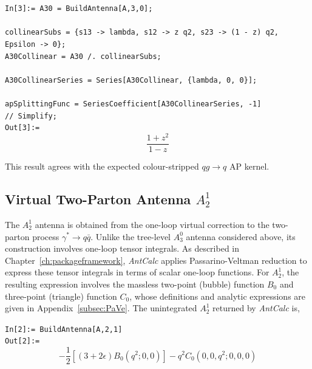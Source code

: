 \begin{mdframed}[backgroundcolor=gray!10, linewidth=0pt]
    \texttt{In[3]:= A30 = BuildAntenna[A,3,0];\\
                    \\
                    collinearSubs = \{s13 -> lambda, s12 -> z q2, s23 -> (1 - z) q2, \\Epsilon
                     -> 0\};\\
                    A30Collinear = A30 /. collinearSubs;\\
                    \\
                    A30CollinearSeries = Series[A30Collinear, \{lambda, 0, 0\}];\\
                    \\
                    apSplittingFunc = SeriesCoefficient[A30CollinearSeries, -1]\\ 
                    // Simplify;}\\
    \hfill
    \texttt{Out[3]:=}
        \begin{equation*}
            \frac{1+z^2}{1-z}
        \end{equation*}
\end{mdframed}

This result agrees with the expected colour-stripped $qg\to q$ AP kernel. 

\subsection{Virtual Two-Parton Antenna $A_2^1$}\label{subsec:A21}

The $A_2^1$ antenna is obtained from the one-loop virtual correction to the two-parton process
$\gamma^*\to q\bar q$.
Unlike the tree-level $A_3^0$ antenna considered above, its construction involves one-loop tensor
integrals. As described in Chapter~\ref{ch:packageframework}, \textit{AntCalc} applies
Passarino-Veltman reduction to express these tensor integrals in terms of scalar one-loop functions.
For $A_2^1$, the resulting expression involves the massless two-point (bubble) function $B_0$ and
three-point (triangle) function $C_0$, whose definitions and analytic expressions are given in
Appendix~\ref{subsec:PaVe}. The unintegrated $A_2^1$ returned by \textit{AntCalc} is,

\begin{mdframed}[backgroundcolor=gray!10, linewidth=0pt]
\texttt{In[2]:= BuildAntenna[A,2,1]}\\
\hfill
\texttt{Out[2]:=}
    \begin{equation*}
        -\frac12\!\left[(3+2\epsilon)B_0\!\left(q^2;0,0\right)\right] - q^2C_0\!\left(0,0,q^2;0,0,0\right)
    \end{equation*}
\end{mdframed}

